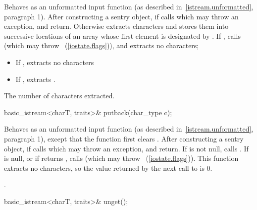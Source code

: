 \begin{itemdescr}
\pnum
\effects
Behaves as an unformatted input function (as described in~\ref{istream.unformatted}, paragraph 1).
After constructing
a sentry object, if
calls
which may throw an exception,
and return.
Otherwise extracts characters and stores them
into successive locations of an array whose first element is designated by
.
If
,
calls
(which may throw
~(\ref{iostate.flags})),
and extracts no characters;
\begin{itemize}
\item
If
,
extracts no characters
\item
If
,
extracts
.
\end{itemize}

\pnum
\returns
The number of characters extracted.
\end{itemdescr}

%
\begin{itemdecl}
basic_istream<charT, traits>& putback(char_type c);
\end{itemdecl}

\begin{itemdescr}
\pnum
\effects
Behaves as an unformatted input function (as described in~\ref{istream.unformatted}, paragraph
1), except that the function first clears .
After constructing
a sentry object, if
calls
which may throw an exception,
and return.
If
is not null, calls
.
If
is null, or if
returns
,
calls
(which may throw
~(\ref{iostate.flags})).
\enternote
This
function extracts no characters, so the value returned by the next call to
is 0.
\exitnote

\pnum
\returns
{}.
\end{itemdescr}

%
\begin{itemdecl}
basic_istream<charT, traits>& unget();
\end{itemdecl}

